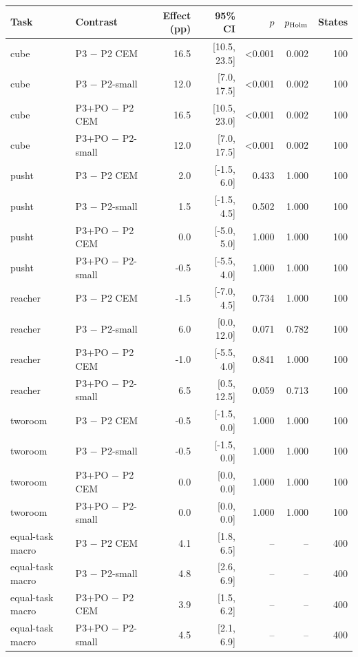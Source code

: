 \begin{tabular}{llrrrrr}
\toprule
Task & Contrast & Effect (pp) & 95\% CI & $p$ & $p_{\rm Holm}$ & States \\
\midrule
cube & P3 $-$ P2 CEM & 16.5 & [10.5, 23.5] & <0.001 & 0.002 & 100 \\
cube & P3 $-$ P2-small & 12.0 & [7.0, 17.5] & <0.001 & 0.002 & 100 \\
cube & P3+PO $-$ P2 CEM & 16.5 & [10.5, 23.0] & <0.001 & 0.002 & 100 \\
cube & P3+PO $-$ P2-small & 12.0 & [7.0, 17.5] & <0.001 & 0.002 & 100 \\
pusht & P3 $-$ P2 CEM & 2.0 & [-1.5, 6.0] & 0.433 & 1.000 & 100 \\
pusht & P3 $-$ P2-small & 1.5 & [-1.5, 4.5] & 0.502 & 1.000 & 100 \\
pusht & P3+PO $-$ P2 CEM & 0.0 & [-5.0, 5.0] & 1.000 & 1.000 & 100 \\
pusht & P3+PO $-$ P2-small & -0.5 & [-5.5, 4.0] & 1.000 & 1.000 & 100 \\
reacher & P3 $-$ P2 CEM & -1.5 & [-7.0, 4.5] & 0.734 & 1.000 & 100 \\
reacher & P3 $-$ P2-small & 6.0 & [0.0, 12.0] & 0.071 & 0.782 & 100 \\
reacher & P3+PO $-$ P2 CEM & -1.0 & [-5.5, 4.0] & 0.841 & 1.000 & 100 \\
reacher & P3+PO $-$ P2-small & 6.5 & [0.5, 12.5] & 0.059 & 0.713 & 100 \\
tworoom & P3 $-$ P2 CEM & -0.5 & [-1.5, 0.0] & 1.000 & 1.000 & 100 \\
tworoom & P3 $-$ P2-small & -0.5 & [-1.5, 0.0] & 1.000 & 1.000 & 100 \\
tworoom & P3+PO $-$ P2 CEM & 0.0 & [0.0, 0.0] & 1.000 & 1.000 & 100 \\
tworoom & P3+PO $-$ P2-small & 0.0 & [0.0, 0.0] & 1.000 & 1.000 & 100 \\
equal-task macro & P3 $-$ P2 CEM & 4.1 & [1.8, 6.5] & -- & -- & 400 \\
equal-task macro & P3 $-$ P2-small & 4.8 & [2.6, 6.9] & -- & -- & 400 \\
equal-task macro & P3+PO $-$ P2 CEM & 3.9 & [1.5, 6.2] & -- & -- & 400 \\
equal-task macro & P3+PO $-$ P2-small & 4.5 & [2.1, 6.9] & -- & -- & 400 \\
\bottomrule
\end{tabular}
